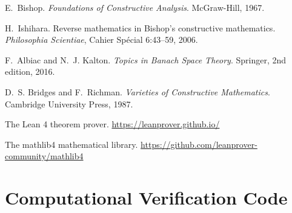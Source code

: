 \documentclass[11pt]{article}  %
\begin{document}

\begin{thebibliography}{10}

E.~Bishop.
\newblock \emph{Foundations of Constructive Analysis}.
\newblock McGraw-Hill, 1967.

H.~Ishihara.
\newblock Reverse mathematics in Bishop's constructive mathematics.
\newblock \emph{Philosophia Scientiae}, Cahier Sp\'ecial 6:43--59, 2006.

F.~Albiac and N.~J. Kalton.
\newblock \emph{Topics in Banach Space Theory}.
\newblock Springer, 2nd edition, 2016.

D.~S. Bridges and F.~Richman.
\newblock \emph{Varieties of Constructive Mathematics}.
\newblock Cambridge University Press, 1987.

The Lean 4 theorem prover.
\newblock \url{https://leanprover.github.io/}

The mathlib4 mathematical library.
\newblock \url{https://github.com/leanprover-community/mathlib4}

\end{thebibliography}


\appendix

\section{Computational Verification Code}
\end{document}
